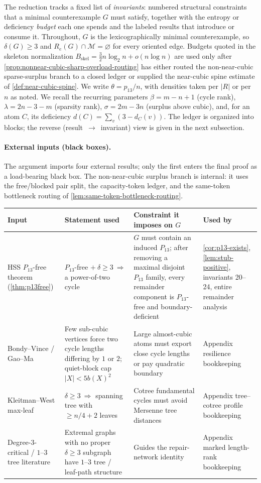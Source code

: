 \documentclass[11pt]{article}
\newcommand{\Mers}{\mathcal M}
\begin{document}
The reduction tracks a fixed list of \emph{invariants}: numbered structural constraints that a minimal counterexample $G$ must satisfy, together with the entropy or deficiency \emph{budget} each one spends and the labeled results that introduce or consume it.  Throughout, $G$ is the lexicographically minimal counterexample, so $\delta(G)\ge3$ and $R_e(G)\cap\Mers=\varnothing$ for every oriented edge.  Budgets quoted in the skeleton normalization $B_{\mathrm{skel}}=\tfrac32 n\log_2 n+o(n\log n)$ are used only after \cref{prop:nonnear-cubic-sharp-overload-routing} has either routed the non-near-cubic sparse-surplus branch to a closed ledger or supplied the near-cubic spine estimate of \cref{def:near-cubic-spine}.  We write $\theta=p_{13}/n$, with densities taken per $|R|$ or per $n$ as noted.  We recall the recurring parameters $\beta=m-n+1$ (cycle rank), $\lambda=2n-3-m$ (sparsity rank), $\sigma=2m-3n$ (surplus above cubic), and, for an atom $C$, its deficiency $d(C)=\sum_{v}(3-d_C(v))$.  The ledger is organized into blocks; the reverse (result~$\to$~invariant) view is given in the next subsection.

\paragraph{External inputs (black boxes).}
The argument imports four external results; only the first enters the final
proof as a load-bearing black box.  The non-near-cubic surplus branch is
internal: it uses the
free/blocked pair split, the capacity-token ledger, and the same-token
bottleneck routing of \cref{lem:same-token-bottleneck-routing}.

{\small
\begin{longtable}{L{0.17\textwidth} L{0.28\textwidth} L{0.27\textwidth} L{0.20\textwidth}}
\toprule
\textbf{Input} & \textbf{Statement used} & \textbf{Constraint it imposes on $G$} & \textbf{Used by} \\
\midrule
\endhead
HSS $P_{13}$-free theorem (\cref{thm:p13free}) & $P_{13}$-free $+\ \delta\ge3\ \Rightarrow$ a power-of-two cycle & $G$ must contain an induced $P_{13}$; after removing a maximal disjoint $P_{13}$ family, every remainder component is $P_{13}$-free and boundary-deficient & \cref{cor:p13-exists}, \cref{lem:stub-positive}, invariants 20--24, entire remainder analysis \\
Bondy--Vince / Gao--Ma & Few sub-cubic vertices force two cycle lengths differing by $1$ or $2$; quiet-block cap $|X|<5b(X)^2$ & Large almost-cubic atoms must export close cycle lengths or pay quadratic boundary & Appendix resilience bookkeeping \\
Kleitman--West max-leaf & $\delta\ge3\ \Rightarrow$ spanning tree with $\ge n/4+2$ leaves & Cotree fundamental cycles must avoid Mersenne tree distances & Appendix tree--cotree profile bookkeeping \\
Degree-3-critical / $1$--$3$ tree literature & Extremal graphs with no proper $\delta\ge3$ subgraph have $1$--$3$ tree / leaf-path structure & Guides the repair-network identity & Appendix marked length-rank bookkeeping \\
\bottomrule
\end{longtable}
}
\end{document}
